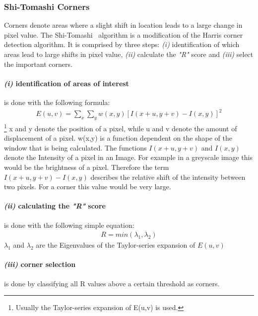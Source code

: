 \documentclass[11pt,a4paper]{article}
\begin{document}
\subsubsection{Shi-Tomashi Corners} \label{Sec:Shi-Tomashi}
Corners denote areas where a slight shift in location leads to a large change in pixel value. 
The Shi-Tomashi~\cite{Shi_tomasi} algorithm is a modification of the Harris corner detection algorithm. 
It is comprised by three steps: \emph{(i)} identification of which areas lead to large shifts in pixel value, \emph{(ii)} calculate the \textit{"R"} score and \emph{(iii)} select the important corners.
\paragraph{\emph{(i)} identification of areas of interest} is done with the following formula:
\begin{align*}
    E(u,v) = \sum_{x} \sum_y w(x,y) [I(x+u,y+v)- I(x,y)]^2  
\end{align*}
\footnote{Usually the Taylor-series expansion of E(u,v) is used.}
x and y denote the position of a pixel, while u and v denote the amount of displacement of a pixel.
w(x,y) is a function dependent on the shape of the window that is being calculated. 
The functions $I(x+u,y+v)$ and $I(x,y)$ denote the Intensity of a pixel in an Image.
For example in a greyscale image this would be the brightness of a pixel.
Therefore the term $I(x+u,y+v)- I(x,y)$ describes the relative shift of the intensity between two pixels. For a corner this value would be very large.
\paragraph{\emph{(ii)} calculating the \textit{"R"} score} is done with the following simple equation:
\begin{align*}
   R = min(\lambda_1, \lambda_2) 
\end{align*}
$\lambda_1$ and $\lambda_2$ are the Eigenvalues of the Taylor-series expansion of $E(u,v)$
\paragraph{\emph{(iii)} corner selection} is done by classifying all R values above a certain threshold as corners.
\end{document}
